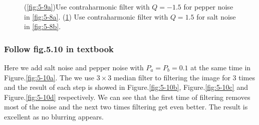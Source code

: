 \begin{figure}[h]
\begin{subfigure}[b]{0.4\linewidth}
		\caption{}
		\label{fig:5-9b}
	\end{subfigure}
  	\caption{(\ref{fig:5-9a})Use contraharmonic filter with $Q=-1.5$ for pepper noise in \ref{fig:5-8a}. (\ref{fig:5-9b}) Use contraharmonic filter with $Q=1.5$ for salt noise in \ref{fig:5-8b}.}
  	\label{fig:5-9}
\end{figure}

\subsubsection{Follow fig.5.10 in textbook}
Here we add salt noise and pepper noise with $P_a=P_b=0.1$ at the same time in Figure.\ref{fig:5-10a}. The we use $3\times 3$ median filter to filtering the image for 3 times and the result of each step is showed in Figure.\ref{fig:5-10b}, Figure.\ref{fig:5-10c} and Figure.\ref{fig:5-10d} respectively. We can see that the first time of filtering removes most of the noise and the next two times filtering get even better. The result is excellent as no blurring appears.
